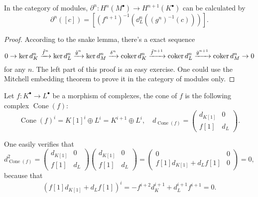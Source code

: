 In the category of modules, $\partial^n:H^n(M^\bullet)\to H^{n+1}(K^\bullet)$ can be calculated by
\[
	\partial^n([c])=\left[(f^{n+1})^{-1}\left(\dd^n_L\left((g^n)^{-1}(c)\right)\right)\right].
\]

\begin{proof}
	According to the snake lemma, there's a exact sequence
	\[
		0\to \ker d_K^n\xrightarrow{\hat f^n} \ker d_L^n
		\xrightarrow{\hat g^n}
		\ker d_M^n \xrightarrow{\delta^n}
		\operatorname{coker} d_K^n\xrightarrow{\bar f^{n+1}} \operatorname{coker} d_L^n\xrightarrow{\bar g^{n+1}} \operatorname{coker} d_M^n \to 0
	\]
	for any $n$. The left part of this proof is an easy exercise.
	One could use the Mitchell embedding theorem to prove it in the category
	of modules only.
\end{proof}


\begin{definition}[Cone]
Let $f:K^\bullet\to L^\bullet$ be a morphism of complexes,
the cone of $f$ is the following complex $\operatorname{Cone}(f)$:
\[
	\operatorname{Cone}(f)^i=K[1]^i\oplus L^i=K^{i+1}\oplus L^i,\quad
	d_{\operatorname{Cone}(f)}=\begin{pmatrix}
		d_{K[1]}&0\\
		f[1]&d_L
	\end{pmatrix}.
\]
\end{definition}
One easily verifies that
\[
	d_{\operatorname{Cone}(f)}^2=\begin{pmatrix}
		d_{K[1]}&0\\
		f[1]&d_L
	\end{pmatrix}\begin{pmatrix}
		d_{K[1]}&0\\
		f[1]&d_L
	\end{pmatrix}
	=\begin{pmatrix}
		0&0\\
		f[1]d_{K[1]}+d_Lf[1]&0
	\end{pmatrix}
	=0,
\]
because that
\[
	(f[1]d_{K[1]}+d_Lf[1])^i =
	-f^{i+2}d_K^{i+1}+d_L^{i+1} f^{i+1}=0.
\]

